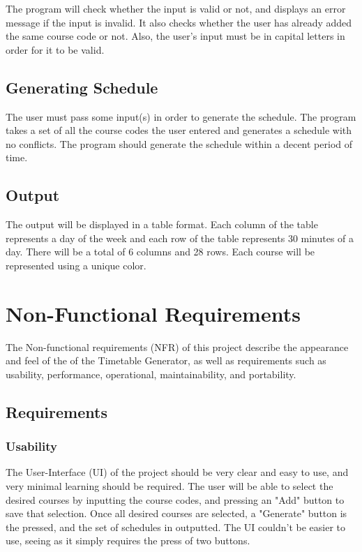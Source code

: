 \documentclass[12pt]{article}
\begin{document}
\tab The program will check whether the input is valid or not, and displays an error message if the input is invalid. It also checks whether the user has already added the same course code or not. Also, the user's input must be in capital letters in order for it to be valid.
\
\subsection{Generating Schedule}
\tab The user must pass some input(s) in order to generate the schedule. The program takes a set of all the course codes the user entered and generates a schedule with no conflicts. The program should generate the schedule within a decent period of time. 

\subsection{Output}
\tab The output will be displayed in a table format. Each column of the table represents a day of the week and each row of the table represents 30 minutes of a day. There will be a total of 6 columns and 28 rows. Each course will be represented using a unique color.

\newpage
\section{Non-Functional Requirements}
\tab The Non-functional requirements (NFR) of this project describe the appearance and feel of the of the Timetable Generator, as well as requirements such as usability, performance, operational, maintainability, and portability.

\subsection{Requirements}
\subsubsection{Usability}
\tab The User-Interface (UI) of the project should be very clear and easy to use, and very minimal learning should be required. The user will be able to select the desired courses by inputting the course codes, and pressing an "Add" button to save that selection. Once all desired courses are selected, a "Generate" button is the pressed, and the set of schedules in outputted. The UI couldn't be easier to use, seeing as it simply requires the press of two buttons.
\end{document}

